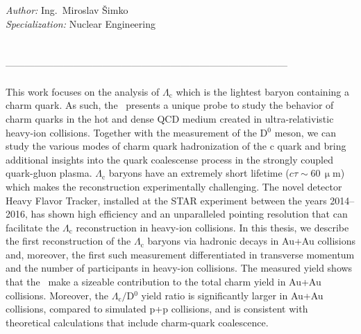 \pagestyle{fancy}
\mbox{}
\newpage

\\
{\bf \engtitle}\\

\noindent
{\it Author:}        Ing.\ Miroslav Šimko \\

\noindent
{\it Specialization:}     Nuclear Engineering\\


 \skolitel \\

 \konzultant\\  
--------------------------------------------------------------------------------------- \\

 \\
\noindent  This work focuses on the analysis of $\Lambda_\mathrm{c}$ which is the lightest baryon containing a charm quark. As such, the \Lambdac\ presents a unique probe to study
the behavior of charm quarks in the hot and dense QCD medium created in ultra-relativistic heavy-ion collisions. Together with the measurement of the D$^0$ meson,
we can study the various modes of charm quark hadronization of the c quark and bring additional insights into the  quark coalescense process in the strongly coupled quark-gluon plasma.
$\Lambda_\mathrm{c}$ baryons have an extremely short lifetime ($c \tau \sim 60\,\upmu$m) which makes the reconstruction experimentally challenging. The novel detector Heavy Flavor Tracker, installed at the STAR experiment between the years 2014--2016, has
shown high efficiency and an unparalleled pointing resolution that can facilitate the $\Lambda_\mathrm{c}$ reconstruction  in heavy-ion collisions.
In this thesis, we describe the first reconstruction of the $\Lambda_\mathrm{c}$ baryons via hadronic decays in Au+Au collisions and, moreover, the first such measurement differentiated in transverse momentum and the number of participants in heavy-ion collisions. The measured yield shows that the \Lambdac\ make a sizeable contribution to the total charm yield in Au+Au collisions. Moreover, the $\Lambda_\mathrm{c}/$D$^0$ yield ratio is significantly larger in Au+Au collisions, compared to simulated p+p collisions, and is consistent with theoretical calculations that include charm-quark coalescence.
\\

